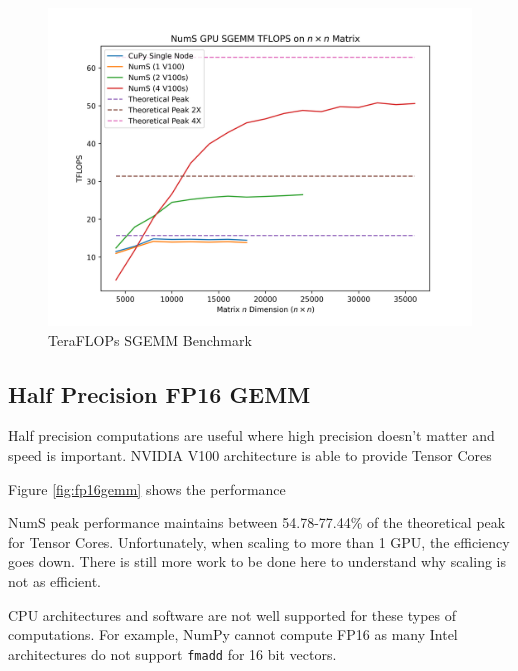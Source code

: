 \documentclass{article}
\begin{document}
\begin{figure}
  \centerline{\includegraphics[width=5in]{figures/NumS_GPU_TFLOPS_SGEMM.png}}
  \caption{TeraFLOPs SGEMM Benchmark}
  \label{fig:sgemm}
\end{figure}

\subsection{Half Precision FP16 GEMM}
Half precision computations are useful where high precision doesn't matter and speed is important. NVIDIA V100 architecture is able to provide Tensor Cores 

Figure \ref{fig:fp16gemm} shows the performance

NumS peak performance maintains between 54.78-77.44\% of the theoretical peak for Tensor Cores. Unfortunately, when scaling to more than 1 GPU, the efficiency goes down. There is still more work to be done here to understand why scaling is not as efficient.

CPU architectures and software are not well supported for these types of computations. For example, NumPy cannot compute FP16 as many Intel architectures do not support \verb|fmadd| for 16 bit vectors. 
\end{document}
